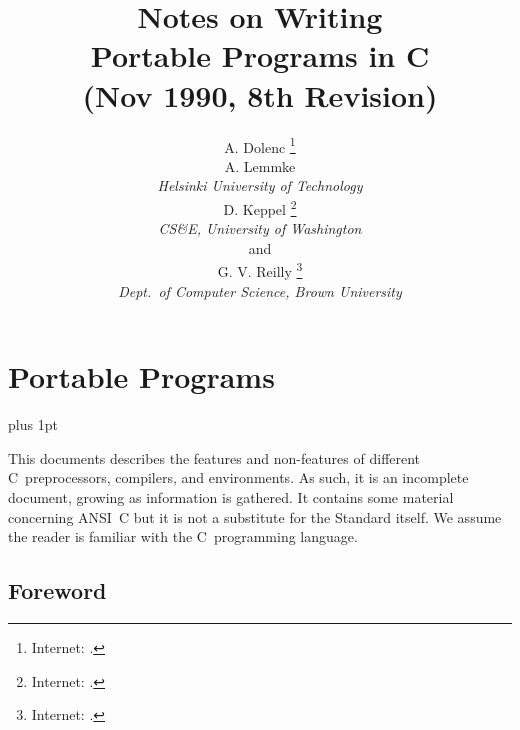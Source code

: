 
\chapter{Portable Programs}

\label{portable}


\title{{\bf Notes on Writing\\Portable Programs in C}\\
       {\small (Nov 1990, 8th Revision)}
      }

\author{A. Dolenc%
  \protect\thanks{Internet: .}
       \\ A. Lemmke \\
  {\em Helsinki University of Technology} \\
         D. Keppel%
  \protect\thanks{Internet: .} \\
  {\em CS\&E, University of Washington} \\
         {\normalsize and} \\
	G. V. Reilly%
  \protect\thanks{Internet: .} \\
  {\em Dept.\ of Computer Science, Brown University}
}
\porttitle

{
\abstract
\parskip=4pt plus 1pt
\parindent=0pt

This documents describes the features and non-features of 
different C~preprocessors, compilers, and environments.  As such,
it is an incomplete document, growing as information is gathered.
It contains some material concerning ANSI~C but it is not a
substitute for the Standard itself.
We assume the reader is familiar with the C~programming language.
\endabstract
}

\pagebreak
\raggedbottom

\section{Foreword}


